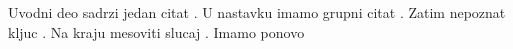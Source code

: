 \documentclass{article}
\begin{document}
Uvodni deo sadrzi jedan citat \cite{a}.  
U nastavku imamo grupni citat \cite{b,a,c}.  
Zatim nepoznat kljuc \cite{nepoznat}.  
Na kraju mesoviti slucaj \cite{b, nepoznat2, p}.
Imamo ponovo \cite{a}


\end{document}
